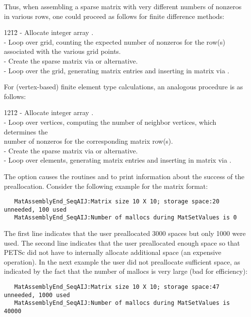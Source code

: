 Thus, when assembling a sparse matrix with very different
numbers of nonzeros in various rows, one could proceed 
as follows for finite difference methods:
\begin{tabbing}
12\=12\= \kill
    \> - Allocate integer array .\\
    \> - Loop over grid, counting the expected number of nonzeros for the row(s)\\
    \>\>  associated with the various grid points.\\
    \> - Create the sparse matrix via  or alternative.\\
    \> - Loop over the grid, generating matrix entries and inserting 
      in matrix via .\\
  \end{tabbing}
\vspace{-0.2in}
For (vertex-based) finite element type calculations, an analogous procedure is as follows:
  \begin{tabbing}
12\=12\= \kill
    \> - Allocate integer array .\\
    \>- Loop over vertices, computing the number of neighbor vertices, which determines the\\
    \>\> number of nonzeros for the corresponding matrix row(s).\\
    \> - Create the sparse matrix via  or alternative.\\
    \> - Loop over elements, generating matrix entries and inserting
      in matrix via .\\
  \end{tabbing}

The   option causes the routines
 and  to print
information about the success of the preallocation.  Consider the
following example for the  matrix format:
\begin{verbatim}
   MatAssemblyEnd_SeqAIJ:Matrix size 10 X 10; storage space:20 unneeded, 100 used
   MatAssemblyEnd_SeqAIJ:Number of mallocs during MatSetValues is 0
\end{verbatim}
The first line indicates that the user preallocated 3000 spaces but only
1000 were used. The second line indicates that the user preallocated
enough space so that PETSc did not have to internally allocate additional
space (an expensive operation).  In the next example the user did not
preallocate sufficient space, as indicated by the fact that the number
of mallocs is very large (bad for efficiency):
\begin{verbatim}
   MatAssemblyEnd_SeqAIJ:Matrix size 10 X 10; storage space:47 unneeded, 1000 used
   MatAssemblyEnd_SeqAIJ:Number of mallocs during MatSetValues is 40000
\end{verbatim}
 
